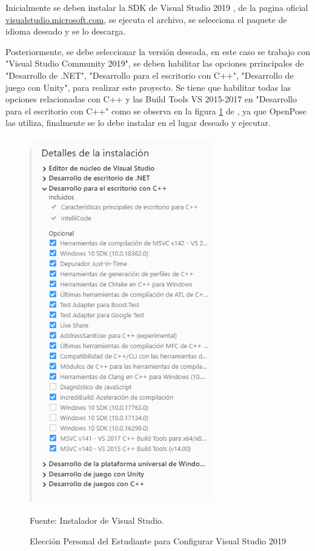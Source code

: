 Inicialmente se deben instalar la SDK de Visual Studio 2019 , de la pagina oficial  \href{https://visualstudio.microsoft.com/es/thank-you-downloading-visual-studio/?sku=Community&rel=16}{visualstudio.microsoft.com}, se ejecuta el archivo, se selecciona el paquete de idioma deseado y se lo descarga.

Posteriormente, se debe seleccionar la versión deseada, en este caso se trabajo con "Visual Studio Community 2019", se deben habilitar las opciones prrincipales de "Desarrollo de .NET", "Desarrollo para el escritorio con C++", "Desarrollo de juego con Unity", para realizar este proyecto. Se tiene que habilitar todas las opciones relacionadas con C++ y las Build Tools VS 2015-2017 en "Desarrollo para el escritorio con C++" como se observa en la figura \ref{vsinstall} de , ya que OpenPose las utiliza, finalmente se lo debe instalar en el lugar deseado y ejecutar.


\begin{figure}[t!]
	\centering
	\includegraphics[width=8cm,height=16cm,]{./Images/eleccionesvsinstall.png}
	\caption{Elección Personal del Estudiante para Configurar Visual Studio 2019}
	\footnotesize Fuente: Instalador de Visual Studio.
	\label{vsinstall}
\end{figure}


